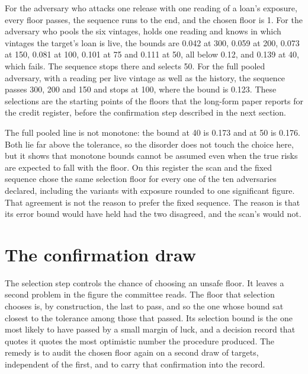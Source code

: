 For the adversary who attacks one release with one reading of a loan's exposure, every
floor passes, the sequence runs to the end, and the chosen floor is 1. For the adversary
who pools the six vintages, holds one reading and knows in which vintages the target's
loan is live, the bounds are 0.042 at 300, 0.059 at 200, 0.073 at 150, 0.081 at 100,
0.101 at 75 and 0.111 at 50, all below 0.12, and 0.139 at 40, which fails. The sequence
stops there and selects 50. For the full pooled adversary, with a reading per live
vintage as well as the history, the sequence passes 300, 200 and 150 and stops at 100,
where the bound is 0.123.
These selections are the starting points of the floors that the long-form paper
reports for the credit register, before the confirmation step described in the next
section.

The full pooled line is not monotone: the bound at 40 is 0.173 and at 50 is 0.176.
Both lie far above the tolerance, so the disorder does not touch the choice here, but it
shows that monotone bounds cannot be assumed even when the true risks are expected to
fall with the floor. On this register the scan and the fixed sequence chose the same
selection floor for every one of the ten adversaries declared, including the variants
with exposure rounded to one significant figure.
That agreement is not the reason to prefer the fixed sequence. The reason is that its
error bound would have held had the two disagreed, and the scan's would not.

\section{The confirmation draw}

The selection step controls the chance of choosing an unsafe floor. It leaves a second
problem in the figure the committee reads. The floor that selection chooses is, by
construction, the last to pass, and so the one whose bound sat closest to the tolerance
among those that passed. Its selection bound is the one most likely to have passed by a
small margin of luck, and a decision record that quotes it quotes the most optimistic
number the procedure produced. The remedy is to audit the chosen floor again on a second
draw of targets, independent of the first, and to carry that confirmation into the
record.


